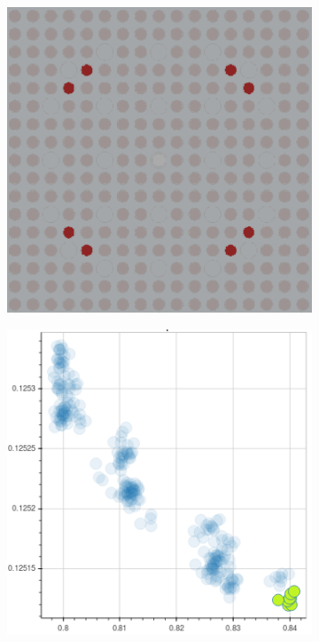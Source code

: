 \begin{figure}[h!]
\begin{subfigure}{0.45\textwidth}
  \caption{}
  \label{fig:chap10-capt-mean-spect-ind-mgxs}
\end{subfigure}
\begin{subfigure}{0.45\textwidth}
  \centering
  \includegraphics[width=0.9\linewidth]{figures/unsupervised/features/assm-16/u238-capt/mean-spect-ind/geometry-2}
  \caption{}
  \label{fig:chap10-capt-mean-spect-ind-geom-2}
\end{subfigure}%
\begin{subfigure}{0.45\textwidth}
  \centering
  \includegraphics[width=0.9\linewidth]{figures/unsupervised/features/assm-16/u238-capt/mean-spect-ind/mgxs-2}

\end{subfigure}
\end{figure}
